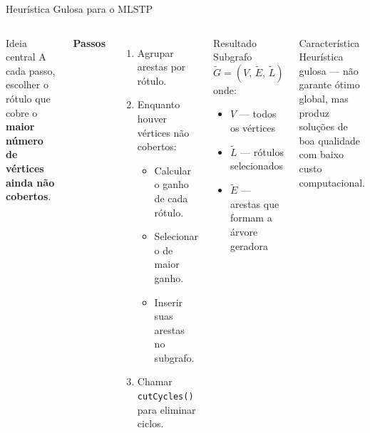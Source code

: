 \documentclass{beamer}
\begin{document}
\begin{frame}{Heurística Gulosa para o MLSTP}

\begin{columns}[T]

    \begin{block}{Ideia central}
        A cada passo, escolher o rótulo que cobre o \textbf{maior número de vértices ainda não cobertos}.
    \end{block}

    \vspace{0.3cm}

    \textbf{Passos}
    \begin{enumerate}
        \item Agrupar arestas por rótulo.
        \item Enquanto houver vértices não cobertos:
        \begin{itemize}
            \item Calcular o ganho de cada rótulo.
            \item Selecionar o de maior ganho.
            \item Inserir suas arestas no subgrafo.
        \end{itemize}
        \item Chamar \texttt{cutCycles()} para eliminar ciclos.
    \end{enumerate}

    \begin{exampleblock}{Resultado}
        Subgrafo $\tilde{G} = (V,\, \tilde{E},\, \tilde{L})$ onde:
        \begin{itemize}
            \item $V$ — todos os vértices
            \item $\tilde{L}$ — rótulos selecionados
            \item $\tilde{E}$ — arestas que formam a árvore geradora
        \end{itemize}
    \end{exampleblock}

    \vspace{0.3cm}

    \begin{alertblock}{Característica}
        Heurística gulosa — não garante ótimo global, mas produz soluções de boa qualidade com baixo custo computacional.
    \end{alertblock}

\end{columns}

\end{frame}
\end{document}
